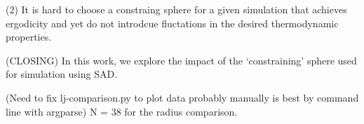 \documentclass[letterpaper,twocolumn,amsmath,amssymb,pre,aps,10pt]{revtex4-1}
\newcommand{\blue}[1]{{\bf \color{blue} #1}}
\newcommand{\jpsays}[1]{{\color{red} [\blue{Jordan:} \emph{#1}]}}
\begin{document}
(2) It is hard to choose a constraing sphere for a given simulation that achieves
ergodicity and yet do not introdcue fluctations in the desired thermodynamic
properties.

(CLOSING) In this work, we explore the impact of the `constraining' sphere used for simulation
using SAD.

(Need to fix lj-comparison.py to plot data probably manually is best by command line with argparse)
N = 38 for the radius comparison.


%
%
%
%
%
\end{document}
